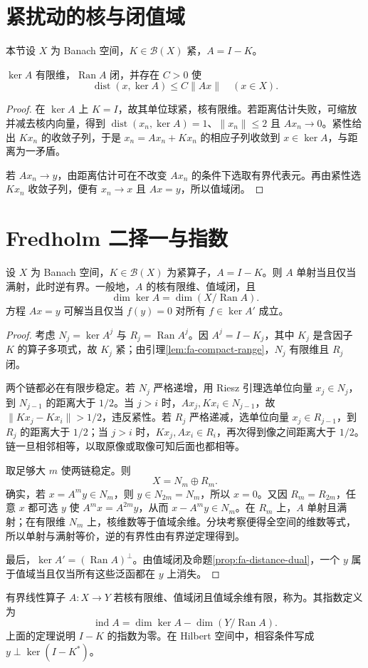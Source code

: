 \documentclass[UTF8,12pt,a4paper,fontset=fandol]{ctexbook}
\begin{document}
\section{紧扰动的核与闭值域}
本节设 $X$ 为 Banach 空间，$K\in\mathcal B(X)$ 紧，$A=I-K$。
\begin{lemma}\label{lem:fa-compact-range}
$\ker A$ 有限维，$\operatorname{Ran}A$ 闭，并存在 $C>0$ 使
\[
 \operatorname{dist}(x,\ker A)\leq C\|Ax\|\quad(x\in X).
\]
\end{lemma}
\begin{proof}
在 $\ker A$ 上 $K=I$，故其单位球紧，核有限维。若距离估计失败，可缩放并减去核内向量，得到 $\operatorname{dist}(x_n,\ker A)=1$、$\|x_n\|\leq2$ 且 $Ax_n\to0$。紧性给出 $Kx_n$ 的收敛子列，于是 $x_n=Ax_n+Kx_n$ 的相应子列收敛到 $x\in\ker A$，与距离为一矛盾。

若 $Ax_n\to y$，由距离估计可在不改变 $Ax_n$ 的条件下选取有界代表元。再由紧性选 $Kx_n$ 收敛子列，便有 $x_n\to x$ 且 $Ax=y$，所以值域闭。
\end{proof}

\section{Fredholm 二择一与指数}
\begin{theorem}\label{thm:fa-fredholm-alternative}
设 $X$ 为 Banach 空间，$K\in\mathcal B(X)$ 为紧算子，$A=I-K$。则 $A$ 单射当且仅当满射，此时逆有界。一般地，$A$ 的核有限维、值域闭，且
\[
 \dim\ker A=\dim(X/\operatorname{Ran}A).
\]
方程 $Ax=y$ 可解当且仅当 $f(y)=0$ 对所有 $f\in\ker A'$ 成立。
\end{theorem}
\begin{proof}
考虑 $N_j=\ker A^j$ 与 $R_j=\operatorname{Ran}A^j$。因 $A^j=I-K_j$，其中 $K_j$ 是含因子 $K$ 的算子多项式，故 $K_j$ 紧；由引理\ref{lem:fa-compact-range}，$N_j$ 有限维且 $R_j$ 闭。

两个链都必在有限步稳定。若 $N_j$ 严格递增，用 Riesz 引理选单位向量 $x_j\in N_j$，到 $N_{j-1}$ 的距离大于 $1/2$。当 $j>i$ 时，$Ax_j,Kx_i\in N_{j-1}$，故 $\|Kx_j-Kx_i\|>1/2$，违反紧性。若 $R_j$ 严格递减，选单位向量 $x_j\in R_{j-1}$，到 $R_j$ 的距离大于 $1/2$；当 $j>i$ 时，$Kx_j,Ax_i\in R_i$，再次得到像之间距离大于 $1/2$。链一旦相邻相等，以取原像或取像可知后面也都相等。

取足够大 $m$ 使两链稳定。则
\[
 X=N_m\oplus R_m.
\]
确实，若 $x=A^my\in N_m$，则 $y\in N_{2m}=N_m$，所以 $x=0$。又因 $R_m=R_{2m}$，任意 $x$ 都可选 $y$ 使 $A^mx=A^{2m}y$，从而 $x-A^my\in N_m$。在 $R_m$ 上，$A$ 单射且满射；在有限维 $N_m$ 上，核维数等于值域余维。分块考察便得全空间的维数等式，所以单射与满射等价，逆的有界性由有界逆定理得到。

最后，$\ker A'=(\operatorname{Ran}A)^\perp$。由值域闭及命题\ref{prop:fa-distance-dual}，一个 $y$ 属于值域当且仅当所有这些泛函都在 $y$ 上消失。
\end{proof}
有界线性算子 $A:X\to Y$ 若核有限维、值域闭且值域余维有限，称为。其指数定义为
\begin{equation}
 \operatorname{ind}A=\dim\ker A-\dim(Y/\operatorname{Ran}A).
 \label{eq:fa-fredholm-index}
\end{equation}
上面的定理说明 $I-K$ 的指数为零。在 Hilbert 空间中，相容条件写成 $y\perp\ker(I-K^*)$。
\end{document}
